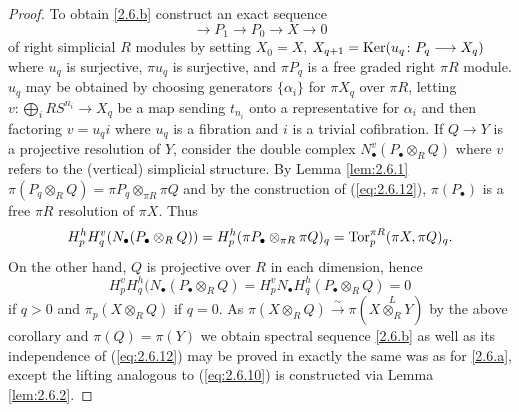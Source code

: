\documentclass[../main]{subfiles}
\begin{document}
\begin{proof}
To obtain \ref{2.6.b} construct an exact sequence 
\begin{equation}\label{eq:2.6.12}\tag{12}
    \longrightarrow  P_1 \longrightarrow  P_0 \longrightarrow  X \longrightarrow  0
\end{equation}
of right simplicial $R$ modules by setting $X_0 = X$, $X_{q+1} = \operatorname{Ker}(u_q \colon P_{q} \longrightarrow  X_{q})$ where $u_q$ is surjective, $\pi u_q$ is surjective, and $\pi P_q$ is a free graded right $\pi R$ module. $u_q$ may be obtained by choosing generators $\{ \alpha_i \}$ for $\pi X_q$ over $\pi R$, letting $v \colon \bigoplus_i RS^{n_i} \longrightarrow  X_q$ be a map sending $t_{n_i}$ onto a representative for $\alpha_i$ and then factoring $v = u_q i$ where $u_q$ is a fibration and $i$ is a trivial cofibration. If $Q \longrightarrow  Y$ is a projective resolution of $Y$, consider the double complex $N_{\bullet }^{v} (P_{\bullet } \otimes_R Q)$ where $v$ refers to the (vertical) simplicial structure.
By Lemma \ref{lem:2.6.1} $\pi (P_q \otimes_R Q) = \pi P_q \otimes_{\pi R} \pi Q$ and by the construction of (\ref{eq:2.6.12}), $\pi (P_{\bullet })$ is a free $\pi R$ resolution of $\pi X$. Thus 
\[H_p^{h} H_q^{v} (N_{\bullet } (P_{\bullet } \otimes_R Q)) = H_p^{h} (\pi P_{\bullet } \otimes_{\pi R} \pi Q)_q = \operatorname{Tor}_p^{\pi R} (\pi X, \pi Q)_q.\] On the other hand, $Q$ is projective over $R$ in each dimension, hence 
\[H_p^{v} H_q^{h} (N_{\bullet } (P_{\bullet } \otimes_R Q) = H_p^{v} N_{\bullet } H_q^{h} (P_{\bullet } \otimes_R Q) = 0\]
if $q > 0$ and $\pi_p (X \otimes_R Q)$ if $q = 0$. As $\pi (X \otimes_R Q ) \overset{\sim}{\to}\pi (X \overset{L}{\otimes_R} Y)$ by the above corollary and $\pi (Q) = \pi (Y)$ we obtain spectral sequence \ref{2.6.b} as well as its independence of (\ref{eq:2.6.12}) may be proved in exactly the same was as for \ref{2.6.a}, except the lifting analogous to (\ref{eq:2.6.10}) is constructed via Lemma \ref{lem:2.6.2}. 


\end{proof}
\end{document}
